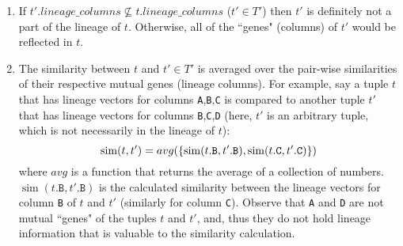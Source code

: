 \begin{enumerate}
    \begin{enumerate}
        \item If $t'.lineage\_columns \nsubseteq t.lineage\_columns$ ($t' \in T'$) then $t'$ is definitely not a part of the lineage of $t$. Otherwise, all of the ``genes" (columns) of $t'$ would be reflected in $t$.
        \item The similarity between $t$ and $t' \in T'$ is averaged over the pair-wise similarities of their respective mutual genes (lineage columns).
        For example, say a tuple $t$ that has lineage vectors for columns \texttt{A},\texttt{B},\texttt{C} is compared to another tuple $t'$ that has lineage vectors for columns \texttt{B},\texttt{C},\texttt{D} (here, $t'$ is an arbitrary tuple, which is not necessarily in the lineage of $t$):\\
        \begin{equation*}
            \operatorname{sim}(t, t') = avg(\{\operatorname{sim}(t.\texttt{B}, t'.\texttt{B}), 
            \operatorname{sim}(t.\texttt{C}, t'.\texttt{C})\})\\
        \end{equation*}
        where $avg$ is a function that returns the average of a collection of numbers. $\operatorname{sim}(t.\texttt{B}, t'.\texttt{B})$ is the calculated similarity between the lineage vectors for column \texttt{B} of $t$ and $t'$ (similarly for column \texttt{C}). Observe that \texttt{A} and \texttt{D} are not mutual ``genes" of the tuples $t$ and $t'$, and, thus they do not hold lineage information that is valuable to the similarity calculation.
    \end{enumerate}

\end{enumerate}



